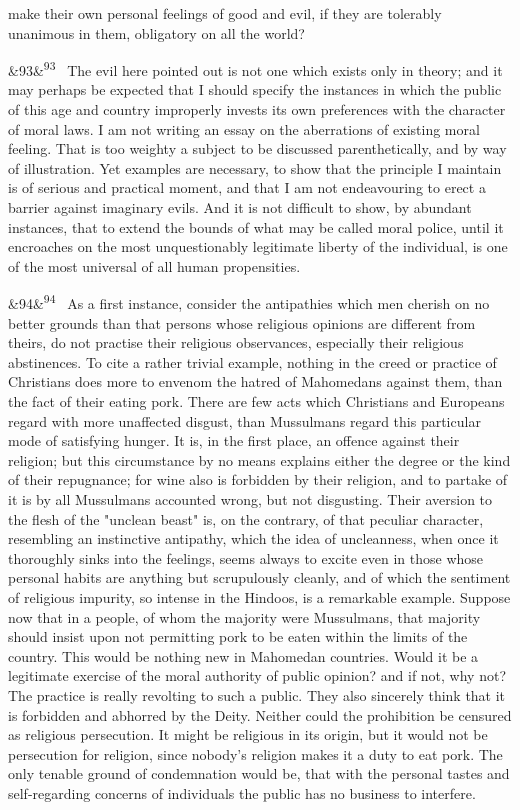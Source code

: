 \documentclass[12pt]{article}
\newcommand{\para}[1][]{\par\noindent\ifx&#1&\else\textsuperscript{\footnotesize #1}~\fi}
\begin{document}
make their own personal feelings of good and evil, if they are tolerably unanimous in them, obligatory on all the world?

\para[93] The evil here pointed out is not one which exists only in theory; and it may perhaps be expected that I should specify the instances in which the public of this age and country improperly invests its own preferences with the character of moral laws. I am not writing an essay on the aberrations of existing moral feeling. That is too weighty a subject to be discussed parenthetically, and by way of illustration. Yet examples are necessary, to show that the principle I maintain is of serious and practical moment, and that I am not endeavouring to erect a barrier against imaginary evils. And it is not difficult to show, by abundant instances, that to extend the bounds of what may be called moral police, until it encroaches on the most unquestionably legitimate liberty of the individual, is one of the most universal of all human propensities.

\para[94] As a first instance, consider the antipathies which men cherish on no better grounds than that persons whose religious opinions are different from theirs, do not practise their religious observances, especially their religious abstinences. To cite a rather trivial example, nothing in the creed or practice of Christians does more to envenom the hatred of Mahomedans against them, than the fact of their eating pork. There are few acts which Christians and Europeans regard with more unaffected disgust, than Mussulmans regard this particular mode of satisfying hunger. It is, in the first place, an offence against their religion; but this circumstance by no means explains either the degree or the kind of their repugnance; for wine also is forbidden by their religion, and to partake of it is by all Mussulmans accounted wrong, but not disgusting. Their aversion to the flesh of the "unclean beast" is, on the contrary, of that peculiar character, resembling an instinctive antipathy, which the idea of uncleanness, when once it thoroughly sinks into the feelings, seems always to excite even in those whose personal habits are anything but scrupulously cleanly, and of which the sentiment of religious impurity, so intense in the Hindoos, is a remarkable example. Suppose now that in a people, of whom the majority were Mussulmans, that majority should insist upon not permitting pork to be eaten within the limits of the country. This would be nothing new in Mahomedan countries. Would it be a legitimate exercise of the moral authority of public opinion? and if not, why not? The practice is really revolting to such a public. They also sincerely think that it is forbidden and abhorred by the Deity. Neither could the prohibition be censured as religious persecution. It might be religious in its origin, but it would not be persecution for religion, since nobody's religion makes it a duty to eat pork. The only tenable ground of condemnation would be, that with the personal tastes and self-regarding concerns of individuals the public has no business to interfere.
\end{document}
